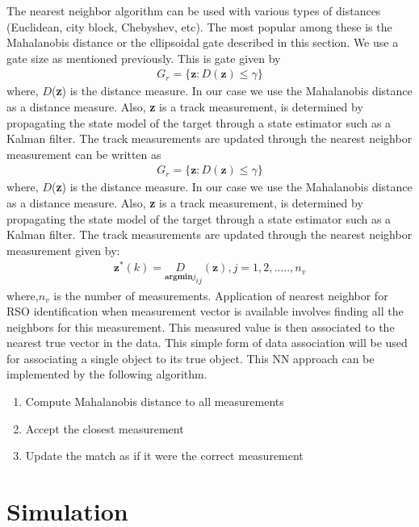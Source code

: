 \documentclass[]{aiaa-tc}%
\begin{document}
The nearest neighbor algorithm can be used with various types of distances (Euclidean, city block, Chebyshev, etc). The most popular among these is the Mahalanobis distance or the ellipsoidal gate described in this section. We use a gate  size as mentioned previously. This is gate given by
\begin{align}
\label{NNEqn}
G_{r} = \lbrace \textbf{z} : D(\textbf{z})\leq\gamma \rbrace
\end{align}
where, $D$(\textbf{z}) is the distance measure. In our case we use the Mahalanobis distance as a distance measure. Also, \textbf{z} is a track measurement, is determined by propagating the state model of the target through a state estimator such as a Kalman filter. The track measurements are updated through the nearest neighbor measurement can be written as
\begin{align}
\label{NNEqn}
G_{r} = \lbrace \textbf{z} : D(\textbf{z})\leq\gamma \rbrace
\end{align}
where, $D$(\textbf{z}) is the distance measure. In our case we use the Mahalanobis distance as a distance measure. Also, \textbf{z} is a track measurement, is determined by propagating the state model of the target through a state estimator such as a Kalman filter. The track measurements are updated through the nearest neighbor measurement given by:
\begin{align}
\textbf{z}^{*}(k) = \underset{\textbf{argmin}{j}} D_{ij}(\textbf{z}), j= 1,2,.....,n_{v}
\end{align}
where,$n_v$ is the number of measurements. Application of nearest neighbor for RSO identification when measurement vector is available involves finding all the neighbors for this measurement. This measured value is then associated to the nearest true vector in the data. This simple form of data association will be used for associating a single object to its true object. This NN approach can be implemented by the following algorithm.
  \begin{enumerate}
\item Compute Mahalanobis distance to all measurements
\item Accept the closest measurement
\item Update the match as if it were the correct measurement
\end{enumerate}

\section{Simulation}
\end{document}
